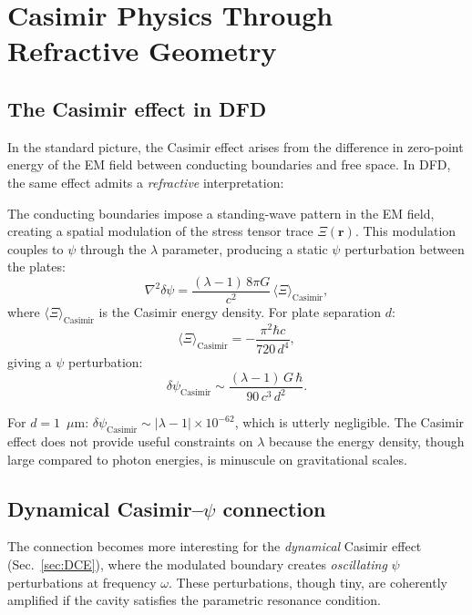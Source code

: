 \documentclass[12pt,aps,prd,twocolumn,superscriptaddress,nofootinbib]{revtex4-2}
\begin{document}
\section{Casimir Physics Through Refractive Geometry}
\label{sec:casimir}

\subsection{The Casimir effect in DFD}

In the standard picture, the Casimir effect arises from the
difference in zero-point energy of the EM field between conducting
boundaries and free space.  In DFD, the same effect admits a
\emph{refractive} interpretation:

The conducting boundaries impose a standing-wave pattern in the EM
field, creating a spatial modulation of the stress tensor trace
$\Xi(\mathbf{r})$.  This modulation couples to $\psi$ through the
$\lambda$ parameter, producing a static $\psi$ perturbation between
the plates:
\begin{equation}
  \nabla^2\delta\psi = \frac{(\lambda - 1)\,8\pi G}{c^2}
  \,\langle\Xi\rangle_{\mathrm{Casimir}},
  \label{eq:casimir_psi}
\end{equation}
where $\langle\Xi\rangle_{\mathrm{Casimir}}$ is the Casimir energy
density.  For plate separation $d$:
\begin{equation}
  \langle\Xi\rangle_{\mathrm{Casimir}}
  = -\frac{\pi^2\hbar c}{720\,d^4},
  \label{eq:casimir_energy}
\end{equation}
giving a $\psi$ perturbation:
\begin{equation}
  \delta\psi_{\mathrm{Casimir}} \sim
    \frac{(\lambda - 1)\,G\,\hbar}{90\,c^3\,d^2}.
  \label{eq:casimir_dpsi}
\end{equation}

For $d = 1$~$\mu$m:
$\delta\psi_{\mathrm{Casimir}} \sim |\lambda - 1| \times 10^{-62}$,
which is utterly negligible.  The Casimir effect does not provide
useful constraints on $\lambda$ because the energy density, though
large compared to photon energies, is minuscule on gravitational scales.

\subsection{Dynamical Casimir--$\psi$ connection}

The connection becomes more interesting for the \emph{dynamical}
Casimir effect (Sec.~\ref{sec:DCE}), where the modulated boundary
creates \emph{oscillating} $\psi$ perturbations at frequency $\omega$.
These perturbations, though tiny, are coherently amplified if the
cavity satisfies the parametric resonance condition.
\end{document}
